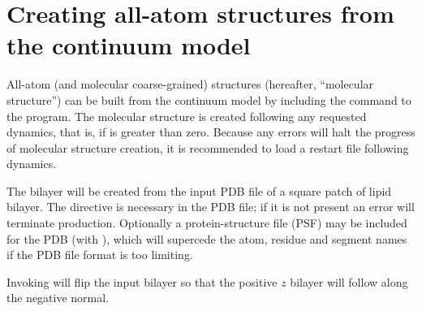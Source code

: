 
\section{ Creating all-atom structures from the continuum model } \label{sec:all_atom}

All-atom (and molecular coarse-grained) structures (hereafter, ``molecular structure'') can be built from the continuum model by including the  command to the  program. 
The molecular structure is created following any requested dynamics, that is, if  is greater than zero.
Because any errors will halt the progress of molecular structure creation, it is recommended to load a restart file following dynamics.

The bilayer will be created from the input  PDB file of a square patch of lipid bilayer.
The  directive is necessary in the PDB file; if it is not present an error will terminate production.
Optionally a protein-structure file (PSF) may be included for the PDB (with ), which will supercede the atom, residue and segment names if the PDB file format is too limiting.

Invoking  will flip the input bilayer so that the positive $z$ bilayer will follow along the negative normal. 
